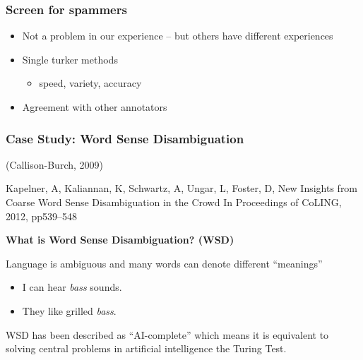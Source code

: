 \documentclass[slides]{beamer} %
\begin{document}
\begin{frame}\frametitle{Screen for spammers}

\begin{itemize}
  \item Not a problem in our experience -- but others have different experiences
  \item Single turker methods
      \begin{itemize}
        \item speed, variety, accuracy
      \end{itemize}
  \item Agreement with other annotators
\end{itemize}

\end{frame}

\begin{frame}\frametitle{Case Study: Word Sense Disambiguation}

 (Callison-Burch, 2009)


\begin{thebibliography}{1}
\tiny
Kapelner, A, Kaliannan, K, Schwartz, A, Ungar, L, Foster, D,  New Insights from Coarse Word Sense Disambiguation in the Crowd In Proceedings of CoLING, 2012, pp539--548
\end{thebibliography} \pause

\vspace{0.5cm}

\textbf{What is Word Sense Disambiguation? (WSD)} \\

\vspace{0.2cm}

Language is ambiguous and many words can denote different ``meanings''

\begin{itemize}
\item I can hear \textit{bass} sounds.
\item They like grilled \textit{bass}.
\end{itemize}

WSD has been described as ``AI-complete'' which means it is equivalent to solving central problems in artificial intelligence \ala the Turing Test.

\end{frame}
\end{document}
